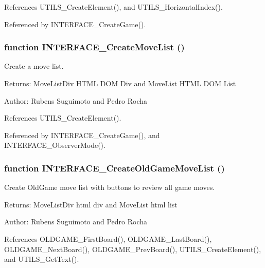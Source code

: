 References UTILS\_\-CreateElement(), and UTILS\_\-HorizontalIndex().

Referenced by INTERFACE\_\-CreateGame().
\subsubsection[INTERFACE\_\-CreateMoveList]{\setlength{\rightskip}{0pt plus 5cm}function INTERFACE\_\-CreateMoveList ()}\label{board_8js_60b1ed03b0878cbeef6a41aae3ee2dfd}


Create a move list. 

\begin{Desc}
\item[Returns:]MoveListDiv HTML DOM Div and MoveList HTML DOM List \end{Desc}
\begin{Desc}
\item[Author:]Rubens Suguimoto and Pedro Rocha \end{Desc}


References UTILS\_\-CreateElement().

Referenced by INTERFACE\_\-CreateGame(), and INTERFACE\_\-ObserverMode().
\subsubsection[INTERFACE\_\-CreateOldGameMoveList]{\setlength{\rightskip}{0pt plus 5cm}function INTERFACE\_\-CreateOldGameMoveList ()}\label{board_8js_11713b286c609bca80ad9024e4a6f34d}


Create OldGame move list with buttons to review all game moves. 

\begin{Desc}
\item[Returns:]MoveListDiv html div and MoveList html list \end{Desc}
\begin{Desc}
\item[Author:]Rubens Suguimoto and Pedro Rocha \end{Desc}


References OLDGAME\_\-FirstBoard(), OLDGAME\_\-LastBoard(), OLDGAME\_\-NextBoard(), OLDGAME\_\-PrevBoard(), UTILS\_\-CreateElement(), and UTILS\_\-GetText().

